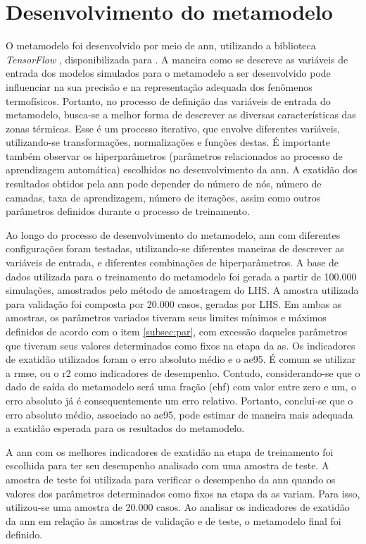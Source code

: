 \section{Desenvolvimento do metamodelo}

O metamodelo foi desenvolvido por meio de \acrfull{ann}, utilizando a biblioteca \textit{TensorFlow} \cite{tensorflow2015}, disponibilizada para .
A maneira como se descreve as variáveis de entrada dos modelos simulados para o metamodelo a ser desenvolvido pode influenciar na sua precisão e na representação adequada dos fenômenos termofísicos.
Portanto, no processo de definição das variáveis de entrada do metamodelo, busca-se a melhor forma de descrever as diversas características das zonas térmicas.
Esse é um processo iterativo, que envolve diferentes variáveis, utilizando-se transformações, normalizações e funções destas. 
É importante também observar os hiperparâmetros (parâmetros relacionados ao processo de aprendizagem automática) escolhidos no desenvolvimento da \acrshort{ann}. 
A exatidão dos resultados obtidos pela \acrshort{ann} pode depender do número de nós, número de camadas, taxa de aprendizagem, número de iterações, assim como outros parâmetros definidos durante o processo de treinamento. 

Ao longo do processo de desenvolvimento do metamodelo, \acrshort{ann} com diferentes configurações foram testadas, utilizando-se diferentes maneiras de descrever as variáveis de entrada, e diferentes combinações de hiperparâmetros.
A base de dados utilizada para o treinamento do metamodelo foi gerada a partir de 100.000 simulações, amostrados pelo método de amostragem do LHS. %
A amostra utilizada para validação foi composta por 20.000 casos, geradas por LHS.
Em ambas as amostras, os parâmetros variados tiveram seus limites mínimos e máximos definidos de acordo com o item \ref{subsec:par}, com excessão daqueles parâmetros que tiveram seus valores determinados como fixos na etapa da \acrshort{as}.
Os indicadores de exatidão utilizados foram o erro absoluto médio e o \acrfull{ae95}.
É comum se utilizar a \acrfull{rmse}, ou o \acrfull{r2} como indicadores de desempenho. Contudo, considerando-se que o dado de saída do metamodelo será uma fração (\acrshort{ehf}) com valor entre zero e um, o erro absoluto já é consequentemente um erro relativo. Portanto, conclui-se que o erro absoluto médio, associado ao \acrlong{ae95}, pode estimar de maneira mais adequada a exatidão esperada para os resultados do metamodelo.

A \acrshort{ann} com os melhores indicadores de exatidão na etapa de treinamento foi escolhida para ter seu desempenho analisado com uma amostra de teste. 
A amostra de teste foi utilizada para verificar o desempenho da \acrshort{ann} quando os valores dos parâmetros determinados como fixos na etapa da \acrshort{as} variam. Para isso, utilizou-se uma amostra de 20.000 casos.
Ao analisar os indicadores de exatidão da \acrshort{ann} em relação às amostras de validação e de teste, o metamodelo final foi definido.
